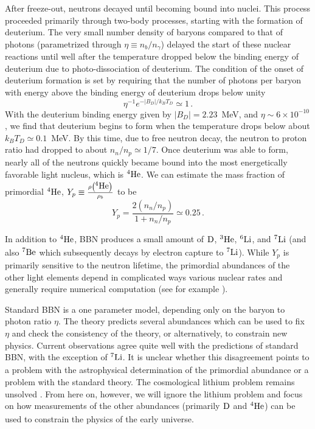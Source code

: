 After freeze-out, neutrons decayed until becoming bound into nuclei.  This process proceeded primarily through two-body processes, starting with the formation of deuterium.  The very small number density of baryons compared to that of photons (parametrized through $\eta\equiv n_b/n_\gamma$) delayed the start of these nuclear reactions until well after the temperature dropped below the binding energy of deuterium due to photo-dissociation of deuterium.  The condition of the onset of deuterium formation is set by requiring that the number of photons per baryon with energy above the binding energy of deuterium drops below unity
\begin{equation}
	\eta^{-1}e^{-|B_D|/k_BT_D} \simeq 1 \, .
\end{equation}
With the deuterium binding energy given by $|B_D|=2.23$~MeV, and $\eta\sim6\times10^{-10}$, we find that deuterium begins to form when the temperature drops below about $k_BT_D\simeq 0.1$~MeV.  By this time, due to free neutron decay, the neutron to proton ratio had dropped to about $n_n/n_p\simeq 1/7$.  Once deuterium was able to form, nearly all of the neutrons quickly became bound into the most energetically favorable light nucleus, which is $\nucl{4}{ }{He}$.  We can estimate the mass fraction of primordial $\nucl{4}{ }{He}$, $Y_p\equiv \frac{\rho\left(\nucl{4}{ }{He}\right)}{\rho_b}$ to be
\begin{equation}
	Y_p = \frac{2(n_n/n_p)}{1+n_n/n_p} \simeq 0.25 \, .
\end{equation}

In addition to $\nucl{4}{ }{He}$, BBN produces a small amount of $\nucl{ }{ }{D}$, $\nucl{3}{ }{He}$, $\nucl{6}{ }{Li}$, and $\nucl{7}{ }{Li}$ (and also $\nucl{7}{ }{Be}$ which subsequently decays by electron capture to $\nucl{7}{ }{Li}$).  While $Y_p$ is primarily sensitive to the neutron lifetime, the primordial abundances of the other light elements depend in complicated ways various nuclear rates and generally require numerical computation (see for example \cite{Wagoner:1966pv,Cyburt:2001pp,Pisanti:2007hk}).

Standard BBN is a one parameter model, depending only on the baryon to photon ratio $\eta$.  The theory predicts several abundances which can be used to fix $\eta$ and check the consistency of the theory, or alternatively, to constrain new physics.  Current observations agree quite well with the predictions of standard BBN, with the exception of $\nucl{7}{ }{Li}$.  It is unclear whether this disagreement points to a problem with the astrophysical determination of the primordial abundance or a problem with the standard theory.  The cosmological lithium problem remains unsolved \cite{Fields:2011zzb}.  From here on, however, we will ignore the lithium problem and focus on how measurements of the other abundances (primarily $\nucl{ }{ }{D}$ and $\nucl{4}{ }{He}$) can be used to constrain the physics of the early universe.




